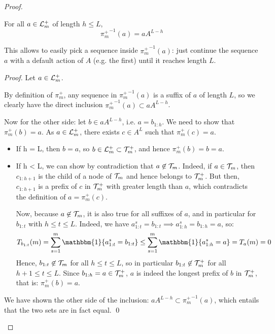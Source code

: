 \documentclass[runningheads]{llncs}
\begin{document}
\begin{proof}
\begin{lemma}
\label{lemma:inverse-proj}
For all $a\in \mathcal{L}_m^+$ of length $h\leq L$,
\begin{equation*}
    {\pi_m^+}^{-1}(a) = a A^{L-h}
\end{equation*}

This allows to easily pick a sequence inside ${\pi_m^+}^{-1}(a)$: just continue the sequence $a$ with a default action of $A$ (e.g. the first) until it reaches length $L$.
\end{lemma}
\begin{proof}
Let $a\in \mathcal{L}_m^+$. 

By definition of $\pi_m^+$, any sequence in ${\pi_m^+}^{-1}(a)$ is a suffix of $a$ of length $L$, so we clearly have the direct inclusion ${\pi_m^+}^{-1}(a) \subset a A^{L-h}$.

Now for the other side: let $b\in a A^{L-h}$, i.e. $a=b_{1:h}$. We need to show that $\pi_m^+(b) = a$.
As $a\in \mathcal{L}_m^+$, there exists $c\in A^L$ such that $\pi_m^+(c) = a$.
\begin{itemize}
    \item If h = L, then $b=a$, so $b \in \mathcal{L}_m^+ \subset \mathcal{T}_m^+$, and hence $\pi_m^+(b)=b=a$.
    \item If h < L, we can show by contradiction that $a \not \in \mathcal{T}_m$. Indeed, if $a \in \mathcal{T}_m$, then $c_{1:h+1}$ is the child of a node of $\mathcal{T}_m$ and hence belongs to $\mathcal{T}_m^+$. But then, $c_{1:h+1}$ is a prefix of $c$ in $\mathcal{T}_m^+$ with greater length than $a$, which contradicts the definition of $a = \pi_m^+(c)$.
    
    Now, because $a \not \in \mathcal{T}_m$, it is also true for all suffixes of $a$, and in particular for $b_{1:t}$ with $h \leq t \leq L$. Indeed, we have $a^s_{1:t} = b_{1:t} \implies a^s_{1:h} = b_{1:h} = a$, so:
    \begin{equation*}
        T_{b_{1:t}}(m) = \sum_{s=1}^m \mathbbm{1}\{a^s_{1:t} = b_{1:t}\} \leq \sum_{s=1}^m \mathbbm{1}\{a^s_{1:h} = a\} = T_a(m) = 0
    \end{equation*}
    Hence, $b_{1:t} \not \in \mathcal{T}_m$ for all $h \leq t \leq L$, so in particular $b_{1:t} \not \in \mathcal{T}_m^+$ for all $h+1 \leq t \leq L$. Since $b_{1:h} = a \in \mathcal{T}_m^+$, $a$ is indeed the longest prefix of $b$ in $\mathcal{T}_m^+$, that is: $\pi_m^+(b) = a$.
\end{itemize}
We have shown the other side of the inclusion: $a A^{L-h} \subset {\pi_m^+}^{-1}(a)$, which entails that the two sets are in fact equal.
\qed
\end{proof}


\end{proof}
\end{document}
